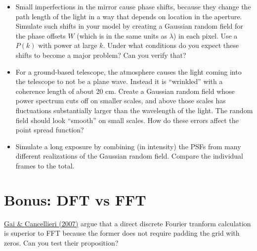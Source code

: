 \documentclass[11pt, preprint]{aastex}
\begin{document}
\begin{itemize} 
\item Small imperfections in the mirror cause phase shifts, because
  they change the path length of the light in a way that depends on
  location in the aperture. Simulate such shifts in your model by
  creating a Gaussian random field for the phase offsets $W$ (which is
  in the same units as $\lambda$) in each pixel. Use a $P(k)$ with
  power at large $k$. Under what conditions do you expect these shifts
  to become a major problem? Can you verify that?
\item For a ground-based telescope, the atmosphere causes the light
  coming into the telescope to not be a plane wave. Instead it is
  ``wrinkled'' with a coherence length of about 20 cm. Create a
  Gaussian random field whose power spectrum cuts off on smaller
  scales, and above those scales has fluctuations substantially larger
  than the wavelength of the light. The random field should look
  ``smooth'' on small scales.  How do these errors affect the point
  spread function?
\item Simulate a long exposure by combining (in intensity) the PSFs
  from many different realizations of the Gaussian random
  field. Compare the individual frames to the total.
\end{itemize}

\section{Bonus: DFT vs FFT}

\href{https://academic.oup.com/mnras/article/377/3/1337/1746974}{Gai
  \& Cancellieri (2007)} argue that a direct discrete Fourier tranform
calculation is superior to FFT because the former does not require
padding the grid with zeros. Can you test their proposition?
\end{document}
